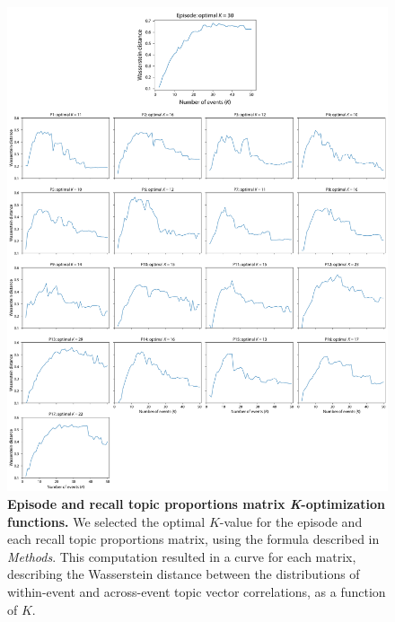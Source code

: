 \documentclass{article}
\begin{document}
\begin{figure}[p!]
\centering
\includegraphics[width=\textwidth]{figs/k_optimization}
\caption{\small \textbf{Episode and recall topic proportions matrix \textit{K}-optimization functions.}  We selected the optimal $K$-value for the episode and each recall topic proportions matrix, using the formula described in \textit{Methods}. This computation resulted in a curve for each matrix, describing the Wasserstein distance between the distributions of within-event and across-event topic vector correlations, as a function of $K$.}
\label{fig:k_optimization}
\end{figure}

\newpage
\renewcommand{\refname}{Supplemental references}
% 

\end{document}
